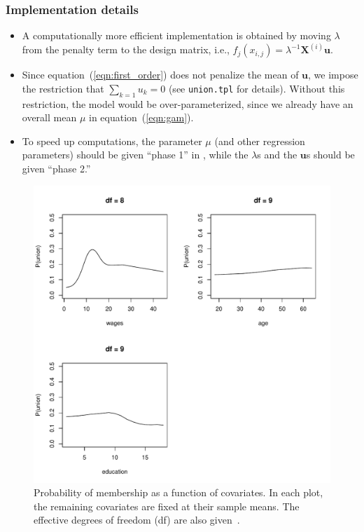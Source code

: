 \documentclass{admbmanual}
\begin{document}
\subsubsection{Implementation details}
\begin{itemize}
  \item A computationally more efficient implementation is obtained by moving
  $\lambda $ from the penalty term to the design matrix, i.e.,
  $f_j(x_{i,j})=\lambda^{-1}\mathbf{X}^{(i)}\mathbf{u}$.

  \item Since equation~(\ref{eqn:first_order}) does not penalize the mean
  of $\mathbf{u}$, we impose the restriction that $\sum_{k=1}u_k=0$ (see
  \texttt{union.tpl} for details). Without this restriction, the model would be
  over-parameterized, since we already have an overall mean $\mu $ in
  equation~(\ref{eqn:gam}).

  \item To speed up computations, the parameter $\mu $ (and other regression
  parameters) should be given ``phase 1'' in \scAB, while the $\lambda $s and
  the $\mathbf{u}$s should be given ``phase 2.''
\end{itemize}

\begin{figure}[htbp]
  \centering\hskip1pt
  \includegraphics[width=6in]{union_fig.pdf}
  \caption{Probability of membership as a function of covariates. In each plot,
    the remaining covariates are fixed at their sample means. The effective
    degrees of freedom (df) are also given~\protect\cite{hast:tibs:1990}.}
  \label{fig:union}
\end{figure}
\end{document}
